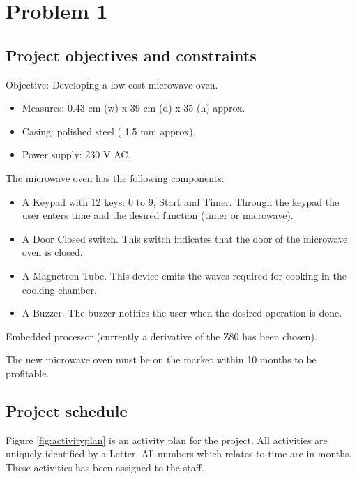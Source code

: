 \chapter{Problem 1}
\label{chp:intro}

\section{Project objectives and constraints}

Objective: Developing a low-cost microwave oven. 

\begin{itemize}
	\setlength\itemsep{0.1em}
	\item Measures: 0.43 cm (w) x 39 cm (d) x 35 (h) approx.
	\item Casing: polished steel ( 1.5 mm approx).
	\item Power supply: 230 V AC.
\end{itemize}

The microwave oven has the following components:

\begin{itemize}
	\setlength\itemsep{0.1em}
	\item A Keypad with 12 keys: 0 to 9, Start and Timer. Through the keypad the user enters
	time and the desired function (timer or microwave).

	\item A Door Closed switch. This switch indicates that the door of the microwave oven is
	closed.

	\item A Magnetron Tube. This device emits the waves required for cooking in the cooking
	chamber.
	
	\item A Buzzer. The buzzer notifies the user when the desired operation is done.
\end{itemize}

Embedded processor (currently a derivative of the Z80 has been chosen).

The new microwave oven must be on the market within 10 months to be profitable.

\section{Project schedule}
Figure \ref{fig:activityplan} is an activity plan for the project. All activities are uniquely identified by a Letter. All numbers which relates to time are in months. These activities has been assigned to the staff. 

